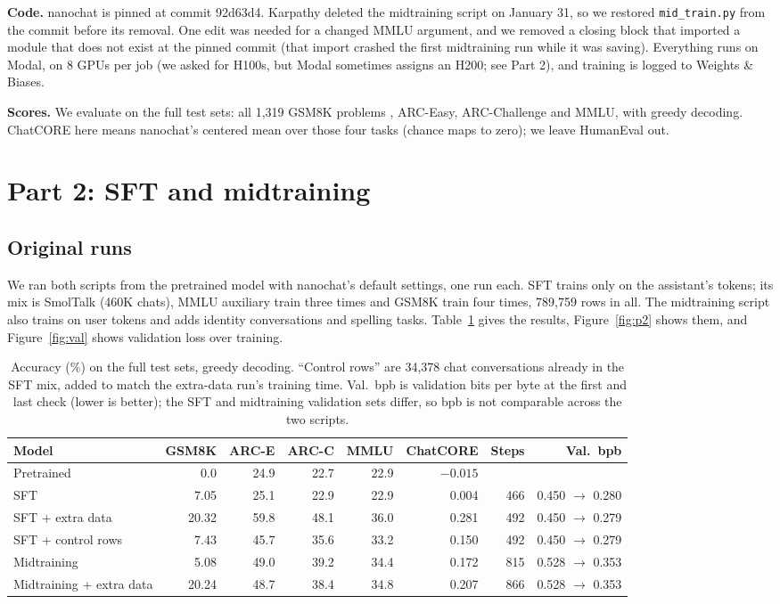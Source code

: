 \documentclass[10pt]{article}
\newcommand{\code}[1]{\texttt{#1}}
\begin{document}
\textbf{Code.} nanochat is pinned at commit 92d63d4. Karpathy deleted the midtraining script on January 31, so we restored \code{mid\_train.py} from the commit before its removal. One edit was needed for a changed MMLU argument, and we removed a closing block that imported a module that does not exist at the pinned commit (that import crashed the first midtraining run while it was saving). Everything runs on Modal, on 8 GPUs per job (we asked for H100s, but Modal sometimes assigns an H200; see Part 2), and training is logged to Weights \& Biases.

\textbf{Scores.} We evaluate on the full test sets: all 1{,}319 GSM8K problems \cite{cobbe2021}, ARC-Easy, ARC-Challenge and MMLU, with greedy decoding. ChatCORE here means nanochat's centered mean over those four tasks (chance maps to zero); we leave HumanEval out.

\section*{Part 2: SFT and midtraining}

\subsection*{Original runs}
We ran both scripts from the pretrained model with nanochat's default settings, one run each. SFT trains only on the assistant's tokens; its mix is SmolTalk (460K chats), MMLU auxiliary train three times and GSM8K train four times, 789{,}759 rows in all. The midtraining script also trains on user tokens and adds identity conversations and spelling tasks. Table~\ref{tab:p2} gives the results, Figure~\ref{fig:p2} shows them, and Figure~\ref{fig:val} shows validation loss over training.

\begin{table}[h]
\centering
\small
\begin{tabular}{lrrrrrrr}
\toprule
Model & GSM8K & ARC-E & ARC-C & MMLU & ChatCORE & Steps & Val.\ bpb \\
\midrule
Pretrained & 0.0 & 24.9 & 22.7 & 22.9 & $-0.015$ & & \\
SFT & 7.05 & 25.1 & 22.9 & 22.9 & 0.004 & 466 & 0.450 $\to$ 0.280 \\
SFT + extra data & 20.32 & 59.8 & 48.1 & 36.0 & 0.281 & 492 & 0.450 $\to$ 0.279 \\
SFT + control rows & 7.43 & 45.7 & 35.6 & 33.2 & 0.150 & 492 & 0.450 $\to$ 0.279 \\
Midtraining & 5.08 & 49.0 & 39.2 & 34.4 & 0.172 & 815 & 0.528 $\to$ 0.353 \\
Midtraining + extra data & 20.24 & 48.7 & 38.4 & 34.8 & 0.207 & 866 & 0.528 $\to$ 0.353 \\
\bottomrule
\end{tabular}
\caption{Accuracy (\%) on the full test sets, greedy decoding. ``Control rows'' are 34{,}378 chat conversations already in the SFT mix, added to match the extra-data run's training time. Val.\ bpb is validation bits per byte at the first and last check (lower is better); the SFT and midtraining validation sets differ, so bpb is not comparable across the two scripts.}
\label{tab:p2}
\end{table}
\end{document}
